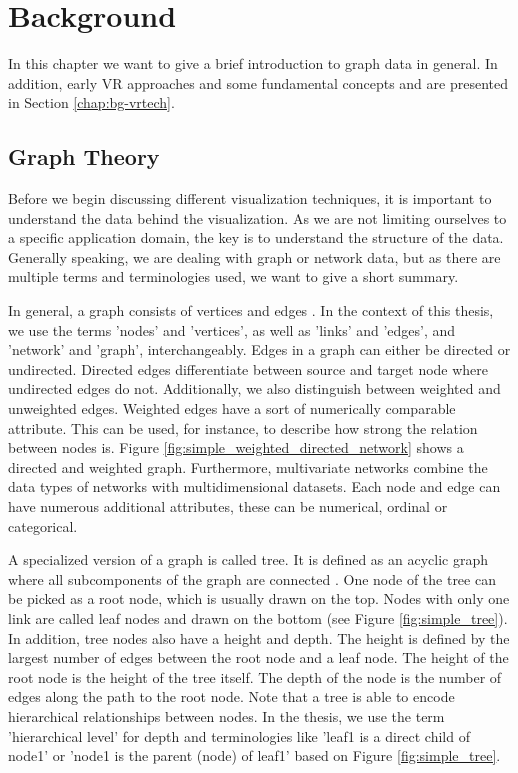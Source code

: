 \chapter{Background}
In this chapter we want to give a brief introduction to graph data in general. In addition, early VR approaches and some fundamental concepts and are presented in Section \ref{chap:bg-vrtech}. 
\section{Graph Theory}
\label{chap:bg-graphTheory}
Before we begin discussing different visualization techniques, it is important to understand the data behind the visualization. As we are not limiting ourselves to a specific application domain, the key is to understand the structure of the data. Generally speaking, we are dealing with graph or network data, but as there are multiple terms and terminologies used, we want to give a short summary. 

In general, a graph consists of vertices and edges \cite{diestel_graph_2017}. In the context of this thesis, we use the terms 'nodes' and 'vertices', as well as 'links' and 'edges', and 'network' and 'graph', interchangeably. Edges in a graph can either be directed or undirected. Directed edges differentiate between source and target node where undirected edges do not. Additionally, we also distinguish between weighted and unweighted edges. Weighted edges have a sort of numerically comparable attribute. This can be used, for instance, to describe how strong the relation between nodes is. Figure \ref{fig:simple_weighted_directed_network} shows a directed and weighted graph. Furthermore, multivariate networks \cite{kerren_introduction_2014} combine the data types of networks with multidimensional datasets. Each node and edge can have numerous additional attributes, these can be numerical, ordinal or categorical.

A specialized version of a graph is called tree\label{exp:tree}. It is defined as an acyclic graph where all subcomponents of the graph are connected \cite{diestel_graph_2017}. One node of the tree can be picked as a root node, which is usually drawn on the top. Nodes with only one link are called leaf nodes and drawn on the bottom (see Figure \ref{fig:simple_tree}).\\
In addition, tree nodes also have a height and depth. The height is defined by the largest number of edges between the root node and a leaf node. The height of the root node is the height of the tree itself. The depth of the node is the number of edges along the path to the root node. Note that a tree is able to encode hierarchical relationships between nodes. In the thesis, we use the term 'hierarchical level' for depth and terminologies like 'leaf1 is a direct child of node1' or 'node1 is the parent (node) of leaf1' based on Figure \ref{fig:simple_tree}.

